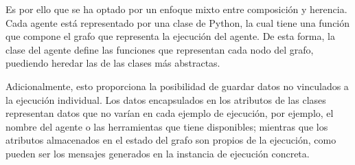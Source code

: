 Es por ello que se ha optado por un enfoque mixto entre composición y herencia. Cada agente está representado por una clase de Python, la cual tiene una función que compone el grafo que representa la ejecución del agente. De esta forma, la clase del agente define las funciones que representan cada nodo del grafo, puediendo heredar las de las clases más abstractas.

Adicionalmente, esto proporciona la posibilidad de guardar datos no vinculados a la ejecución individual. Los datos encapsulados en los atributos de las clases representan datos que no varían en cada ejemplo de ejecución, por ejemplo, el nombre del agente o las herramientas que tiene disponibles; mientras que los atributos almacenados en el estado del grafo son propios de la ejecución, como pueden ser los mensajes generados en la instancia de ejecución concreta.
